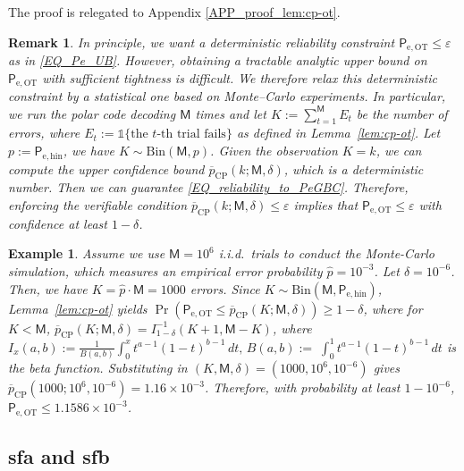 \documentclass[onecolumn]{IEEEtran} %
\newcommand{\1}{\mathbbm{1}}
\theoremstyle{boldremark}
\newtheorem{remark}{Remark}
\newtheorem{example}{Example}
\begin{document}
The proof is relegated to Appendix \ref{APP_proof_lem:cp-ot}.

\begin{remark}
In principle, we want a deterministic reliability constraint
$\textsf{P}_{\mathrm{e,OT}}\le \varepsilon$ as in \eqref{EQ_Pe_UB}. However, obtaining a tractable analytic upper bound on $\textsf{P}_{\mathrm{e,OT}}$ with sufficient tightness is difficult.
We therefore relax this deterministic constraint by a statistical one
based on Monte--Carlo experiments. In particular, we run the polar code decoding $\textsf{M}$ times and let
$K:=\sum_{t=1}^  \textsf{M} E_t$ be the number of errors, where
$E_t:=\mathds{1}\{\text{the $t$-th trial fails}\}$ as defined in Lemma~\ref{lem:cp-ot}.
Let $p:=\textsf{P}_{\mathrm{e,hin}}$, we have $K\sim\mathrm{Bin}(  \textsf{M},p)$.
Given the observation $K=k$, we can compute the upper confidence bound
$\overline p_{\mathrm{CP}}(k;  \textsf{M},\delta)$, which is a deterministic number.
Then we can guarantee \eqref{EQ_reliability_to_PeGBC}. Therefore, enforcing the verifiable condition $\overline p_{\mathrm{CP}}(k;  \textsf{M},\delta)\le \varepsilon$
implies that $\textsf{P}_{\mathrm{e,OT}}\le \varepsilon$
with confidence at least $1-\delta$.
\end{remark}

\begin{example}
Assume we use $\textsf{M}=10^6$ i.i.d.\ trials to conduct the Monte-Carlo simulation, which measures an empirical error probability $\widehat p=10^{-3}$. Let $\delta=10^{-6}$. Then, we have $K=\widehat p\cdot   \textsf{M}=1000$ errors. Since $K\sim\mathrm{Bin}(  \textsf{M},\textsf{P}_{\mathrm{e,hin}})$, Lemma~\ref{lem:cp-ot} yields
$\Pr(\textsf{P}_{\mathrm{e,OT}}\le \overline p_{\mathrm{CP}}(K;  \textsf{M},\delta))\ge 1-\delta$, where for $K<  \textsf{M}$,
$\overline p_{\mathrm{CP}}(K;  \textsf{M},\delta)=I^{-1}_{1-\delta}(K+1,  \textsf{M}-K)$, where \(I_x(a,b):=\frac{1}{B(a,b)}\int_0^x t^{a-1}(1-t)^{b-1}\,dt,\, B(a,b):=\;\int_{0}^{1} t^{a-1}(1-t)^{b-1}\,dt\) is the beta function.
Substituting in $(K,  \textsf{M},\delta)=(1000,10^6,10^{-6})$ gives
$\overline p_{\mathrm{CP}}(1000;10^6,10^{-6}) = 1.16\times 10^{-3}$. Therefore, with probability at least $1-10^{-6}$, $\textsf{P}_{\mathrm{e,OT}}\le 1.1586\times 10^{-3}$.
\end{example}




\subsection{\gls{sfa} and \gls{sfb}}
\end{document}
